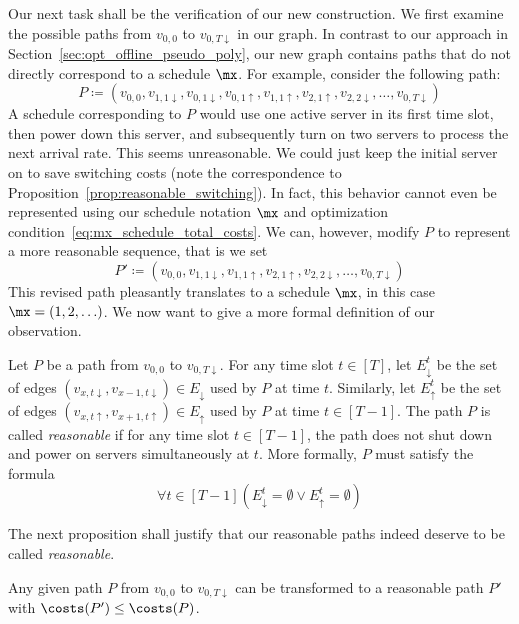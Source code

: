 Our next task shall be the verification of our new construction. We first examine the possible paths from $v_{0,0}$ to $v_{0,T\downarrow}$ in our graph.
In contrast to our approach in Section~\ref{sec:opt_offline_pseudo_poly}, our new graph contains paths that do not directly correspond to a schedule $\mx$. For example, consider the following path:
\begin{equation*}
	P\coloneqq(v_{0,0},v_{1,1\downarrow},v_{0,1\downarrow},v_{0,1\uparrow},v_{1,1\uparrow},v_{2,1\uparrow},v_{2,2\downarrow},\dotsc,v_{0,T\downarrow})
\end{equation*}
A schedule corresponding to $P$ would use one active server in its first time slot, then power down this server, and subsequently turn on two servers to process the next arrival rate. This seems unreasonable. We could just keep the initial server on to save switching costs (note the correspondence to Proposition~\ref{prop:reasonable_switching}). In fact, this behavior cannot even be represented using our schedule notation $\mx$ and optimization condition~\eqref{eq:mx_schedule_total_costs}. We can, however, modify $P$ to represent a more reasonable sequence, that is we set
\begin{equation*}
	P'\coloneqq(v_{0,0},v_{1,1\downarrow},v_{1,1\uparrow},v_{2,1\uparrow},v_{2,2\downarrow},\dotsc,v_{0,T\downarrow})
\end{equation*}
This revised path pleasantly translates to a schedule $\mx$, in this case $\mx=(1,2,\ldots)$. We now want to give a more formal definition of our observation.
\begin{defn}\label{defn_reasn_paths}
Let $P$ be a path from $v_{0,0}$ to $v_{0,T\downarrow}$. For any time slot $t\in[T]$, let $E_\downarrow^t$ be the set of edges $(v_{x,t\downarrow},v_{x-1,t\downarrow})\in E_\downarrow$ used by $P$ at time $t$. Similarly, let $E_\uparrow^t$ be the set of edges $(v_{x,t\uparrow},v_{x+1,t\uparrow})\in E_\uparrow$ used by $P$ at time $t\in[T-1]$.
The path $P$ is called \emph{reasonable} if for any time slot $t\in[T-1]$, the path does not shut down and power on servers simultaneously at $t$. More formally, $P$ must satisfy the formula
\begin{equation}
	\forall t\in[T-1]\left(E_\downarrow^t=\emptyset \lor E_\uparrow^t=\emptyset\right)\label{eq:reasn_path}
\end{equation}
\end{defn}
The next proposition shall justify that our reasonable paths indeed deserve to be called \textit{reasonable}.
\begin{prop}\label{prop:path_to_reasn_path}
Any given path $P$ from $v_{0,0}$ to $v_{0,T\downarrow}$ can be transformed to a reasonable path $P'$ with $\costs(P')\le\costs(P)$.
\end{prop}
